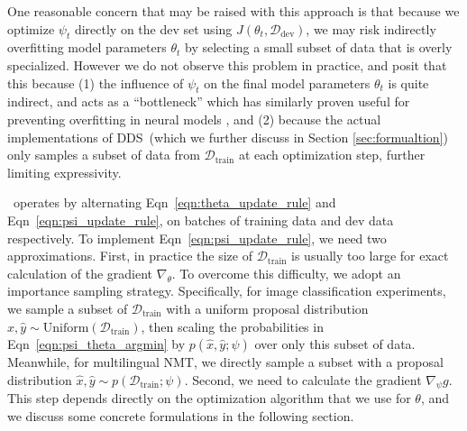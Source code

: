 One reasonable concern that may be raised with this approach is that because we optimize $\psi_t$ directly on the dev set using $J(\theta_t, \mathcal{D}_\text{dev})$, we may risk indirectly overfitting model parameters $\theta_t$ by selecting a small subset of data that is overly specialized.
However we do not observe this problem in practice, and posit that this because (1) the influence of $\psi_t$ on the final model parameters $\theta_t$ is quite indirect, and acts as a ``bottleneck'' which has similarly proven useful for preventing overfitting in neural models \cite{grezl2007probabilistic}, and (2) because the actual implementations of DDS~(which we further discuss in Section \ref{sec:formualtion}) only samples a subset of data from $\mathcal{D}_\text{train}$ at each optimization step, further limiting expressivity.

\dds~operates by alternating Eqn~\ref{eqn:theta_update_rule} and Eqn~\ref{eqn:psi_update_rule}, on batches of training data and dev data respectively. To implement Eqn~\ref{eqn:psi_update_rule}, we need two approximations.
First, in practice the size of $\mathcal{D}_\text{train}$ is usually too large for exact calculation of the gradient $\nabla_\theta$. To overcome this difficulty, we adopt an importance sampling strategy. Specifically, for image classification experiments, we sample a subset of $\mathcal{D}_{\text{train}}$ with a uniform proposal distribution $\hat{x}, \hat{y} \sim \text{Uniform}(\mathcal{D}_\text{train})$, then scaling the probabilities in Eqn~\ref{eqn:psi_theta_argmin} by $p(\hat{x}, \hat{y}; \psi)$ over only this subset of data. Meanwhile, for multilingual NMT, we directly sample a subset with a proposal distribution $\hat{x}, \hat{y} \sim p(\mathcal{D}_\text{train}; \psi)$. Second, we need to calculate the gradient $\nabla_\psi g$. This step depends directly on the optimization algorithm that we use for $\theta$, and we discuss some concrete formulations in the following section.

